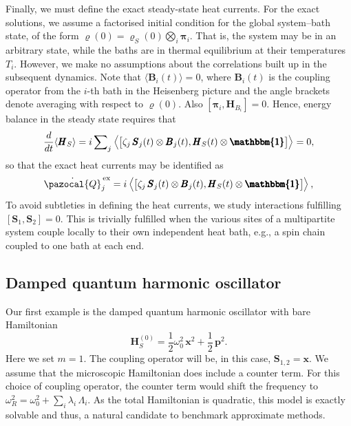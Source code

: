 \documentclass[aps,pra,superscriptaddress,twocolumn,nofootinbib]{revtex4-2}
\begin{document}
Finally, we must define the exact steady-state heat currents. For the exact solutions, we assume a factorised initial condition for the global system--bath state, of the form $ \pmb{\varrho}(0) = \pmb{\varrho}_S(0)\bigotimes_i\pmb{\pi}_i$. That is, the system may be in an arbitrary state, while the baths are in thermal equilibrium at their temperatures $ T_i $. However, we make no assumptions about the correlations built up in the subsequent dynamics. Note that $\langle \pmb{B}_i(t) \rangle = 0$, where $\pmb{B}_i(t)$ is the coupling operator from the $i$-th bath in the Heisenberg picture and the angle brackets denote averaging with respect to $\pmb{\varrho}(0)$. Also $[\pmb{\pi}_i,\pmb{H}_{B_i}] = 0$. Hence, energy balance in the steady state requires that
\begin{equation*}
    \frac{d}{dt}\langle \pmb{H}_S \rangle = i \sum\nolimits_j\left\langle \left[\zeta_j\,\pmb S_j(t) \otimes \pmb B_j(t),\pmb H_S(t) \otimes \pmb{\mathbbm{1}}\right]\right\rangle = 0,
\end{equation*}
so that the exact heat currents may be identified as
\begin{equation}\label{eq:hc-ex}
	\dot{\pazocal{Q}}_j^\text{\,ex} = i \left\langle \left[\zeta_j\,\pmb S_j(t) \otimes \pmb B_j(t),\pmb H_S(t) \otimes \pmb{\mathbbm{1}}\right]\right\rangle,
\end{equation}
To avoid subtleties in defining the heat currents, we study interactions fulfilling $\left[\pmb{S}_1,\pmb{S}_2\right] = 0$. This is trivially fulfilled when the various sites of a multipartite system couple locally to their own independent heat bath, e.g., a spin chain coupled to one bath at each end.

\subsection{Damped quantum harmonic oscillator}

Our first example is the damped quantum harmonic oscillator \cite{caldeira1983path, caldeira1983tunnelling, hanggi2005, lampo2019, cresser2023} with bare Hamiltonian 
\begin{equation*}
	\pmb H_S^{(0)} = \frac{1}{2} \omega_0^2\,\pmb x^2 + \frac{1}{2}\,\pmb p^2.
\end{equation*}
Here we set $m=1$. The coupling operator will be, in this case, $\pmb S_{1,2} = \pmb x$. We assume that the microscopic Hamiltonian does include a counter term. For this choice of coupling operator, the counter term would shift the frequency to $\omega_R^2 = \omega_0^2 + \sum\nolimits_i\lambda_i\,\Lambda_i$. As the total Hamiltonian is quadratic, this model is exactly solvable and thus, a natural candidate to benchmark approximate methods. 
\end{document}
